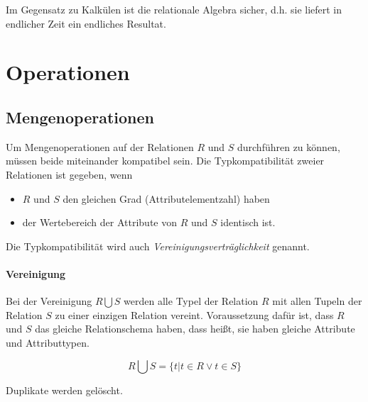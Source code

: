 \documentclass{scrbook}
\begin{document}
Im Gegensatz zu Kalkülen ist die relationale Algebra sicher, d.h.
sie liefert in endlicher Zeit ein endliches Resultat.


\section{Operationen}

\subsection{Mengenoperationen}

Um Mengenoperationen auf der Relationen $R$ und $S$ durchführen zu können,
müssen beide miteinander kompatibel sein.
Die Typkompatibilität zweier Relationen ist gegeben, wenn
\begin{itemize}
\item $R$ und $S$ den gleichen Grad (Attributelementzahl) haben
\item der Wertebereich der Attribute von $R$ und $S$ identisch ist.
\end{itemize}

Die Typkompatibilität wird auch \emph{Vereinigungsverträglichkeit} genannt.

\paragraph{Vereinigung}

Bei der Vereinigung $R ⋃ S$ werden alle Typel der Relation $R$ 
mit allen Tupeln der Relation $S$ zu einer einzigen Relation vereint.
Voraussetzung dafür ist, dass $R$ und $S$ das gleiche Relationschema haben,
dass heißt, sie haben gleiche Attribute und Attributtypen.

\begin{definition}[Vereinigung]
\begin{displaymath}
R ⋃ S = \{t | t ∈ R ∨ t ∈ S \}
\end{displaymath}
\end{definition}

Duplikate werden gelöscht.

% 
% 
% 
%
\end{document}
